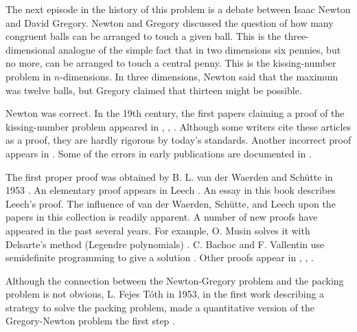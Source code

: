 \label{sec:history}

The next episode in the history of this problem is a debate between
Isaac Newton and David Gregory.  Newton and Gregory discussed the
question of how many congruent balls can be arranged to
touch a given ball.  This is the three-dimensional analogue of the
simple fact that in two dimensions six pennies, but no more, can be
arranged to touch a central penny.  This is the kissing-number
problem in $n$-dimensions. In three dimensions, Newton said that the
maximum was twelve balls, but Gregory claimed that thirteen might
be possible.

Newton was correct.
In the 19th century, the first papers claiming a proof of the
kissing-number problem appeared
in \cite{Ben74}, \cite{Gun75}, \cite{Hop74}.
Although some writers cite these articles
as a proof, they are hardly rigorous by today's standards.
Another incorrect
proof appears in \cite{Boe52}.  
Some of the errors in early publications are documented in \cite{Hal94}.

  The first proper proof was obtained
by B. L. van der Waerden 
and Sch\"utte  in 1953 \cite{Sch53}.
An elementary proof appears in Leech \cite{Lee56}.
An essay in this book describes Leech's proof.
The influence of van der Waerden, Sch\"utte, and Leech upon the
papers in this collection is readily apparent. 
A number of new proofs have appeared in the past several years.  
For example, O. Musin solves it
with Delsarte's method (Legendre polynomials) \cite{Mus06}.  C. Bachoc and F. Vallentin use semidefinite
programming to give a solution \cite{BV06}.  
Other proofs appear in 
\cite{Mae01}, \cite{Ans02},  \cite{Bor03}.   

 Although the
connection between the Newton-Gregory problem and the packing problem
is not obvious, L. Fejes T\'oth 
in 1953, in the first
work describing a strategy to solve the packing problem, made
a quantitative version of the Gregory-Newton problem the first step
\cite{Fej53}.


